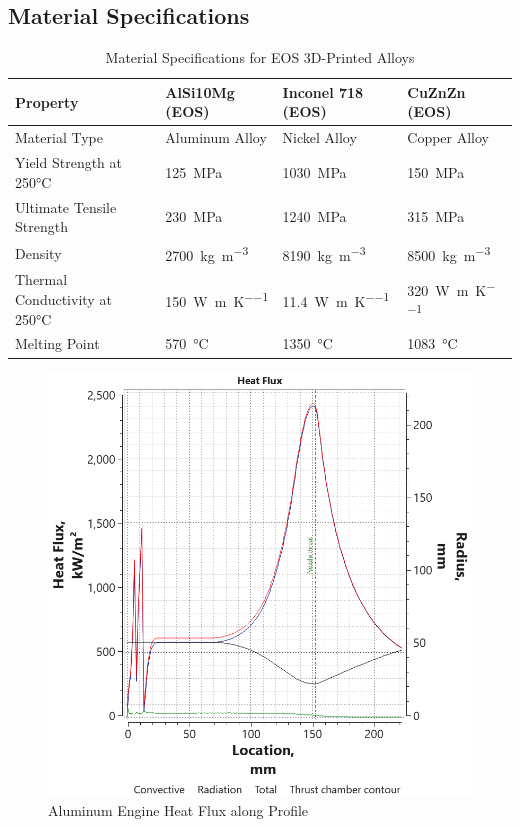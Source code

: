 \subsection{Material Specifications}

\begin{table}[H]
    \centering
    \begin{tabular}{|l|l|l|l|}
        \hline
        \textbf{Property} & \textbf{AlSi10Mg (EOS)} & \textbf{Inconel 718 (EOS)} & \textbf{CuZnZn (EOS)} \\ \hline
        Material Type & Aluminum Alloy & Nickel Alloy & Copper Alloy \\ \hline
        Yield Strength at 250°C & \SI{125}{\mega\pascal} & \SI{1030}{\mega\pascal} & \SI{150}{\mega\pascal} \\ \hline
        Ultimate Tensile Strength & \SI{230}{\mega\pascal} & \SI{1240}{\mega\pascal} & \SI{315}{\mega\pascal} \\ \hline
        Density & \SI{2700}{\kilo\gram\per\meter^3} & \SI{8190}{\kilo\gram\per\meter^3} & \SI{8500}{\kilo\gram\per\meter^3} \\ \hline
        Thermal Conductivity at 250°C & \SI{150}{\watt\per\meter\per\kelvin} & \SI{11.4}{\watt\per\meter\per\kelvin} & \SI{320}{\watt\per\meter\per\kelvin} \\ \hline
        Melting Point & \SI{570}{\celsius} & \SI{1350}{\celsius} & \SI{1083}{\celsius} \\ \hline
    \end{tabular}
    \caption{Material Specifications for EOS 3D-Printed Alloys}
    \label{tab:material_specs}
\end{table}
\begin{figure}[H]
    \centering
    \includegraphics[width=0.75\linewidth]{Images/aluminiumfinalheatflux.png}
    \caption{Aluminum Engine Heat Flux along Profile}
    \label{fig:aluminum_heat_flux}
\end{figure}


